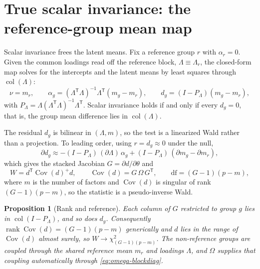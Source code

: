 \documentclass[11pt]{article}
\newcommand{\T}{^{\mathsf T}}
\newcommand{\Cov}{\operatorname{Cov}}
\newcommand{\rank}{\operatorname{rank}}
\newcommand{\Om}{\Omega}
\theoremstyle{plain}
\newtheorem{proposition}{Proposition}
\theoremstyle{remark}
\begin{document}
\section{True scalar invariance: the reference-group mean map}
\label{sec:scalar}

Scalar invariance frees the latent means. Fix a reference group $r$ with
$\alpha_r = 0$. Given the common loadings read off the reference block,
$\Lambda \equiv \Lambda_r$, the closed-form map solves for the intercepts and
the latent means by least squares through $\operatorname{col}(\Lambda)$:
\begin{equation}
  \nu = m_r,
  \qquad
  \alpha_g = (\Lambda\T\Lambda)^{-1}\Lambda\T(m_g - m_r),
  \qquad
  d_g = (I - P_\Lambda)(m_g - m_r),
  \label{eq:refmap}
\end{equation}
with $P_\Lambda = \Lambda(\Lambda\T\Lambda)^{-1}\Lambda\T$. Scalar invariance
holds if and only if every $d_g = 0$, that is, the group mean difference lies in
$\operatorname{col}(\Lambda)$.

The residual $d_g$ is bilinear in $(\Lambda, m)$, so the test is a linearized
Wald rather than a projection. To leading order, using $r = d_g \approx 0$ under
the null,
\begin{equation}
  \partial d_g \approx -(I - P_\Lambda)\,(\partial\Lambda)\,\alpha_g
                       + (I - P_\Lambda)\,(\partial m_g - \partial m_r),
  \label{eq:dg-jac}
\end{equation}
which gives the stacked Jacobian $G = \partial d/\partial\theta$ and
\begin{equation}
  W = d\T \Cov(d)^{+} d,
  \qquad
  \Cov(d) = G\,\Om\, G\T,
  \qquad
  \mathrm{df} = (G-1)(p - m),
  \label{eq:scalar-wald}
\end{equation}
where $m$ is the number of factors and $\Cov(d)$ is singular of rank
$(G-1)(p-m)$, so the statistic is a pseudo-inverse Wald.

\begin{proposition}[Rank and reference]
\label{prop:scalar-rank}
Each column of $G$ restricted to group $g$ lies in
$\operatorname{col}(I - P_\Lambda)$, and so does $d_g$. Consequently
$\rank\Cov(d) = (G-1)(p-m)$ generically and $d$ lies in the range of $\Cov(d)$
almost surely, so $W \to \chi^2_{(G-1)(p-m)}$. The non-reference groups are
coupled through the shared reference mean $m_r$ and loadings $\Lambda$, and
$\Om$ supplies that coupling automatically through \eqref{eq:omega-blockdiag}.
\end{proposition}
\end{document}
